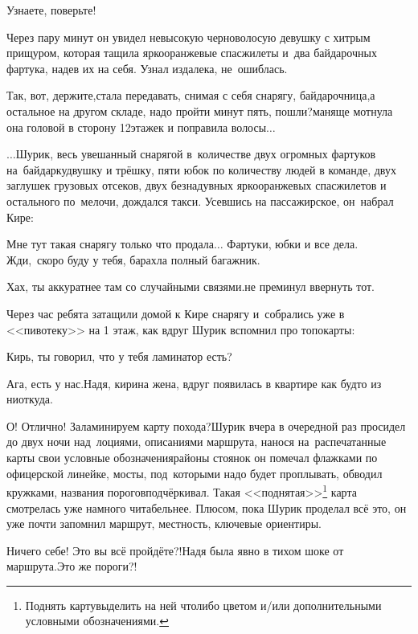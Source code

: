 \diagdash Узнаете, поверьте!

Через пару минут он увидел невысокую черноволосую девушку с хитрым прищуром, которая тащила ярко\sdash оранжевые спасжилеты и~два байдарочных фартука, надев их на себя. Узнал издалека, не~ошиблась.

\diagdash Так, вот, держите,\mdash стала передавать, снимая с себя снарягу, байдарочница,\mdash а остальное на другом складе, надо пройти минут пять, пошли?\mdash маняще мотнула она головой в сторону 12\sdash этажек и поправила волосы$\ldots$

\vspace{0.5cm}
$\ldots$Шурик, весь увешанный снарягой в~количестве двух огромных фартуков на~байдарку\sdash двушку и трёшку, пяти юбок по количеству людей в команде, двух заглушек грузовых отсеков, двух безнадувных ярко\sdash оранжевых спасжилетов и остального по~мелочи, дождался такси. Усевшись на пассажирское, он~набрал Кире:

\diagdash Мне тут такая снарягу только что продала$\ldots$ Фартуки, юбки и все дела. Жди,~скоро буду у тебя, барахла полный багажник.

\diagdash Хах, ты аккуратнее там со случайными связями.\mdash не преминул ввернуть тот. %

Через час ребята затащили домой к Кире снарягу и~собрались уже в <<пивотеку>> на 1 этаж, как вдруг Шурик вспомнил про топокарты:

\diagdash Кирь, ты говорил, что у тебя ламинатор есть?

\diagdash Ага, есть у нас.\mdash Надя, кирина жена, вдруг появилась в квартире как будто из ниоткуда.

\renewcommand*{\thefootnote}{\fnsymbol{footnote}}
\diagdash О! Отлично! Заламинируем карту похода?\mdash Шурик вчера в очередной раз просидел до двух ночи над~лоциями, описаниями маршрута, нанося на~распечатанные карты свои условные обозначения\mdash районы стоянок он помечал флажками по офицерской линейке, мосты, под~которыми надо будет проплывать, обводил кружками, названия порогов\mdash подчёркивал. Такая <<поднятая>>\footnote[1]{Поднять карту\mdash выделить на ней что\sdash либо цветом и/или дополнительными условными обозначениями.} карта смотрелась уже намного читабельнее. Плюсом, пока Шурик проделал всё это, он уже почти запомнил маршрут, местность, ключевые ориентиры.

\diagdash Ничего себе! Это вы всё пройдёте?!\mdash Надя была явно в тихом шоке от маршрута.\mdash Это же пороги?!

